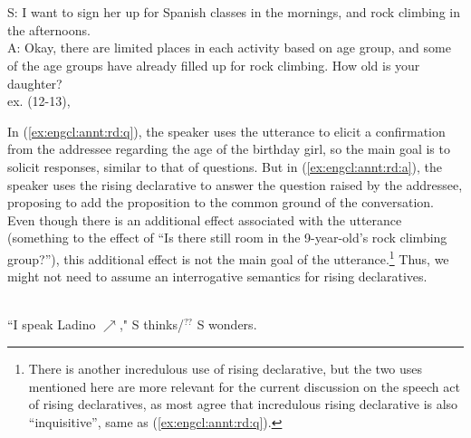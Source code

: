 \bxl
\label{ex:engcl:annt:rd:q}
\\
\ex
\label{ex:engcl:annt:rd:a}
\\
S: I want to sign her up for Spanish classes in the mornings, and rock climbing in the afternoons.\\
A: Okay, there are limited places in each activity based on age group, and some of the age groups have already filled up for rock climbing. How old is your daughter?\\
\exl
\hspace*{\fill}\hfill ex. (12-13), \cite[955]{goodhue2021rd}
\eex

In (\ref{ex:engcl:annt:rd:q}), the speaker uses the utterance to elicit a confirmation from the addressee regarding the age of the birthday girl, so the main goal is to solicit responses, similar to that of questions. But in (\ref{ex:engcl:annt:rd:a}), the speaker uses the rising declarative to answer the question raised by the addressee, proposing to add the proposition  to the common ground of the conversation. Even though there is an additional effect associated with the utterance (something to the effect of ``Is there still room in the 9-year-old’s rock climbing group?''), this additional effect is not the main goal of the utterance.\footnote{There is another incredulous use of rising declarative, but the two uses mentioned here are more relevant for the current discussion on the speech act of rising declaratives, as most agree that incredulous rising declarative is also ``inquisitive'', same as (\ref{ex:engcl:annt:rd:q}).} Thus, we might not need to assume an interrogative semantics for rising declaratives. 


\begin{exe}
\ex \label{ex:bg:theory:prosody:rd-prepose2}
\\
``I speak Ladino $\nearrow$," S thinks/$^{??}$ S wonders.
\end{exe}

